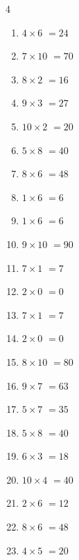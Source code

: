 \begin{multicols}{4}
\begin{enumerate}
  \item $4\times 6$
        $=24$

  \item $7\times 10$
        $=70$

  \item $8\times 2$
        $=16$

  \item $9\times 3$
        $=27$

  \item $10\times 2$
        $=20$

  \item $5\times 8$
        $=40$

  \item $8\times 6$
        $=48$

  \item $1\times 6$
        $=6$

  \item $1\times 6$
        $=6$

  \item $9\times 10$
        $=90$

  \item $7\times 1$
        $=7$

  \item $2\times 0$
        $=0$

  \item $7\times 1$
        $=7$

  \item $2\times 0$
        $=0$

  \item $8\times 10$
        $=80$

  \item $9\times 7$
        $=63$

  \item $5\times 7$
        $=35$

  \item $5\times 8$
        $=40$

  \item $6\times 3$
        $=18$

  \item $10\times 4$
        $=40$

  \item $2\times 6$
        $=12$

  \item $8\times 6$
        $=48$

\columnbreak %

  \item $4\times 5$
        $=20$


\end{enumerate}
\end{multicols}
